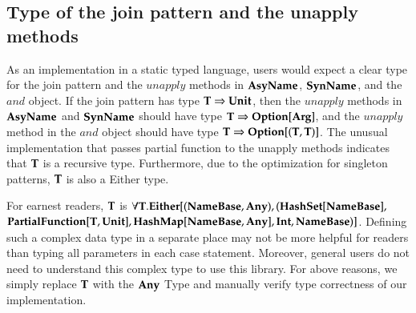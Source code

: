 \subsection{Type of the join pattern and the unapply methods}
As an implementation in a static typed language, users would expect a clear type for the join pattern and the $unapply$ methods in $\bf{AsyName}$, $\bf{SynName}$, and the $and$ object.  If the join pattern has type $\bf{T} \Rightarrow \bf{Unit}$, then the $unapply$ methods in $\bf{AsyName}$ and $\bf{SynName}$ should have type $\bf{T} \Rightarrow \bf{Option[Arg]}$, and the $unapply$ method in the $and$ object should have type $\bf{T \Rightarrow Option[(T, T)]}$.  The unusual implementation that passes partial function to the unapply methods indicates that $\bf{T}$ is a recursive type.  Furthermore, due to the optimization for singleton patterns, $\bf{T}$ is also a Either type.  

For earnest readers, $\bf{T}$ is $\forall \bf{T.Either[(NameBase, Any), (HashSet[NameBase],  }$\\
$\bf{PartialFunction[T, Unit], HashMap[NameBase, Any], Int, NameBase)]}$.  Defining such a complex data type in a separate place may not be more helpful for readers than typing all parameters in each case statement.  Moreover, general users do not need to understand this complex type to use this library.  For above reasons, we simply replace $\bf{T}$ with the $\bf{Any}$ Type and manually verify type correctness of our implementation.

